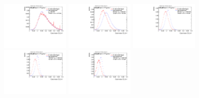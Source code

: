 \begin{figure}
\includegraphics[width=0.3\textwidth]{sascha_input/Appendix/Distributions/higgs/distributions/beta1/h_recoJet_C2_bin1.pdf} \hspace{1mm}
\includegraphics[width=0.3\textwidth]{sascha_input/Appendix/Distributions/higgs/distributions/beta1/h_recoJet_C2_bin2.pdf} \hspace{4mm}
\includegraphics[width=0.3\textwidth]{sascha_input/Appendix/Distributions/higgs/distributions/beta1/h_recoJet_C2_bin3.pdf} 
\bigskip
\includegraphics[width=0.3\textwidth]{sascha_input/Appendix/Distributions/higgs/distributions/beta1/h_recoJet_C2_bin4.pdf} \hspace{4mm}
\includegraphics[width=0.3\textwidth]{sascha_input/Appendix/Distributions/higgs/distributions/beta1/h_recoJet_C2_bin5.pdf} 


\end{figure}
